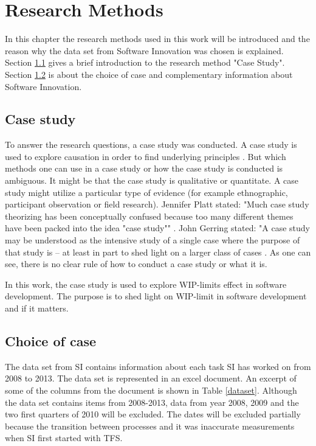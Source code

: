 \documentclass[UKenglish]{ifimaster}  %
\begin{document}
\chapter{Research Methods}
\label{chap:RM}
In this chapter the research methods used in this work will be introduced and the reason why the data set from Software Innovation was chosen is explained. Section \ref{sec:CS} gives a brief introduction to the research method "Case Study".  Section \ref{sec:coc} is about the choice of case and complementary information about Software Innovation. 


\section{Case study}
\label{sec:CS}
To answer the research questions, a case study was conducted.  A case study is used to explore causation in order to find underlying principles \parencite{0078285763}\parencite{9781412960991}.  But which methods one can use in a case study or how the case study is conducted is ambiguous.  It might be that the case study is qualitative or quantitate.  A case study might utilize a particular type of evidence (for example ethnographic, participant observation or field research).  Jennifer Platt stated: "Much case study theorizing has been conceptually confused because too many different themes have been packed into the idea "case study"" \parencite{0521676568}.  John Gerring stated: "A case study may be understood as the intensive study of a single case where the purpose of that study is -- at least in part to shed light on a larger class of cases  \parencite{0521676568}. As one can see, there is no clear rule of how to conduct a case study or what it is. 


In this work, the case study is used to explore WIP-limits effect in software development. The purpose is to shed light on WIP-limit in software development and if it matters.

\section{Choice of case}
\label{sec:coc}
The data set from SI contains information about each task SI has worked on from 2008 to 2013. The data set is represented in an excel document. An excerpt of some of the columns from the document is shown in Table \ref{dataset}. Although the data set contains items from 2008-2013, data from year 2008, 2009 and the two first quarters of 2010 will be excluded. The dates will be excluded partially because the transition between processes and it was inaccurate measurements when SI first started with TFS.
\end{document}
